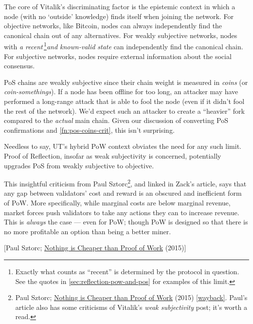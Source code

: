 The core of Vitalik's discriminating factor is the epistemic context in which a node (with no `outside' knowledge) finds itself when joining the network.
For objective networks, like Bitcoin, nodes can always independently find the canonical chain out of any alternatives.
For weakly subjective networks, nodes with \emph{a recent}\,\footnote{
    Exactly what counts as ``recent'' is determined by the protocol in question.
    See the quotes in \autoref{sec:reflection-pow-and-pos} for examples of this limit.
}\emph{and known-valid state} can independently find the canonical chain.
For subjective networks, nodes require external information about the social consensus.

PoS chains are weakly subjective since their chain weight is measured in \emph{coins} (or \emph{coin-somethings}).
If a node has been offline for too long, an attacker may have performed a long-range attack that is able to fool the node (even if it didn't fool the rest of the network).
We'd expect such an attacker to create a ``heavier'' fork compared to the \emph{actual} main chain.
Given our discussion of converting PoS confirmations and \autoref{fn:pos-coins-crit}, this isn't surprising.

Needless to say, UT's hybrid PoW context obviates the need for any such limit.
Proof of Reflection, insofar as weak subjectivity is concerned, potentially upgrades PoS from weakly subjective to objective.


This insightful criticism from Paul Sztorc\footnote{
    Paul Sztorc; \href{\linkSztorcNothingCheaperThanPoW}{Nothing is Cheaper than Proof of Work} (2015) \href{\linkSztorcNothingCheaperMirror}{[wayback]}.
    Paul's article also has some criticisms of Vitalik's \emph{weak subjectivity} post; it's worth a read.
}, and linked in Zack's article, says that any gap between validators' cost and reward is an obscured and inefficient form of PoW.
More specifically, while marginal costs are below marginal revenue, market forces push validators to take any actions they can to increase revenue.
This is \emph{always} the case --- even for PoW; though PoW is designed so that there is no more profitable an option than being a better miner.

[Paul Sztorc; \href{\linkSztorcNothingCheaperThanPoW}{Nothing is Cheaper than Proof of Work} (2015)]

